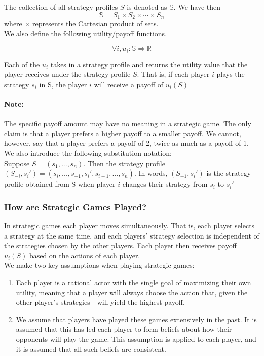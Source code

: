 \documentclass[12pt]{article}
\newcommand{\Note}{\paragraph{Note:}}
\begin{document}
	The collection of all strategy profiles $S$ is denoted as $\mathbb{S}$. We have then 
	\begin{equation*}
	\mathbb{S} = S_1 \times S_2 \times \cdots \times S_n
	\end{equation*} where $\times$ represents the Cartesian product of sets.\\
	
	We also define the following utility/payoff functions.
	
	\begin{equation*}
	\forall i, u_i : \mathbb{S} \Rightarrow \mathbb{R}
	\end{equation*}
	
	Each of the $u_i$ takes in a strategy profile and returns the utility value that the player receives under the strategy profile $S$. That is, if each player $i$ plays the strategy $s_i$ in S, the player $i$ will receive a payoff of $u_i(S)$
	
	\Note The specific payoff amount may have no meaning in a strategic game. The only claim is that a player prefers a higher payoff to a smaller payoff. We cannot, however, say that a player prefers a payoff of 2, twice as much as a payoff of 1.\\
	
	We also introduce the following substitution notation:\\
	
	Suppose $S = (s_1,...,s_n)$. Then the strategy profile $(S_{-i},s_i') = (s_i,...,s_{-1},s_i',s_{i+1},...,s_n)$. In words, $(S_{-1},s_i')$ is the strategy profile obtained from S when player $i$ changes their strategy from $s_i$ to $s_i'$\\
	
	\subsubsection{How are Strategic Games Played?}
	In strategic games each player moves simultaneously. That is, each player selects a strategy at the same time, and each players$'$ strategy selection is independent of the strategies chosen by the other players. Each player then receives payoff $u_i(S)$ based on the actions of each player.\\
	
	We make two key assumptions when playing strategic games:
	\begin{enumerate}
		\item Each player is a rational actor with the single goal of maximizing their own utility, meaning that a player will always choose the action that, given the other player$'$s strategies - will yield the highest payoff.\\
		
		\item We assume that players have played these games extensively in the past. It is assumed that this has led each player to form beliefs about how their opponents will play the game. This assumption is applied to each player, and it is assumed that all such beliefs are consistent.
	\end{enumerate}
	
\end{document}
